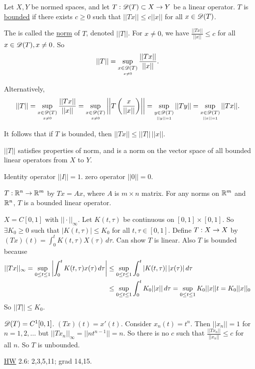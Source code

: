 \documentclass[]{article}
\begin{document}
\newpage

\begin{definition}
	Let $X,Y$ be normed spaces, and let $T:\mathscr{D}(T)\subset X\rightarrow Y$ be a linear operator.
	$T$ is \ul{bounded} if there exists $c\geq0$ such that $||Tx|| \leq c||x||$ for all $x\in\mathscr{D}(T)$.
\end{definition}
\begin{definition}
The  is called the \ul{norm} of $T$, denoted $||T||$.
For $x\neq0$, we have $\frac{||Tx||}{||x||}\leq c$ for all $x\in\mathscr{D}(T),x\neq0$.
So $$||T|| = \sup_{\underset{x\neq0}{x\in\mathscr{D}(T)}}\frac{||Tx||}{||x||}.$$
\end{definition}
Alternatively, $$ ||T|| = \sup_{\underset{x\neq0}{x\in\mathscr{D}(T)}}\frac{||Tx||}{||x||} = \sup_{\underset{x\neq0}{x\in\mathscr{D}(T)}} \left|\left|T\left(\frac x{||x||}\right)\right|\right| = \sup_{\underset{||y||=1}{y\in\mathscr{D}(T)}}||Ty|| = \sup_{\underset{||x||=1}{x\in\mathscr{D}(T)}}||Tx||.$$
\begin{note}
	It follows that if $T$ is bounded, then $||Tx|| \leq ||T||\,||x||$.
\end{note}
\begin{note}
	$||T||$ satisfies properties of  norm, and is a norm on the vector space of all bounded linear operators from $X$ to $Y$.
\end{note}
\begin{example}
	Identity operator $||I|| = 1$. zero operator $||0||=0$.
\end{example}
\begin{example}
	$T:\mathbb{R}^n\rightarrow\mathbb{R}^m$ by $Tx=Ax$, where $A$ is $m\times n$ matrix.
	For any norms on $\mathbb{R}^m$ and $\mathbb{R}^n$, $T$ is a bounded linear operator.
\end{example}
\begin{example}
	$X = C[0,1]$ with $||\cdot||_\infty$.
	Let $K(t,\tau)$ be continuous on $[0,1]\times[0,1]$. So $\exists K_0\geq 0$ such that $|K(t,\tau)|\leq K_0$ for all $t,\tau\in[0,1]$.
	Define $T:X\rightarrow X$ by $(Tx)(t) = \int_0^t K(t,\tau)X(\tau)\,d\tau$.
	Can show $T$ is linear. Also $T$ is bounded because 
	\begin{align*}
		|| Tx||_\infty = \sup_{0\leq t\leq1}\left|\int_0^t K(t,\tau)x(\tau)\,d\tau\right|
		&\leq \sup_{0\leq t\leq 1}\int_0^t |K(t,\tau)|\,|x(\tau)|\,d\tau \\
		&\leq \sup_{0\leq t\leq 1}\int_0^t K_0||x||\,d\tau
					   = \sup_{0\leq t\leq 1}K_0||x||t
					   = K_0||x||_0
	\end{align*}
	So $||T||\leq K_0$.
\end{example}
\begin{example}
	[$X = C{[}0,1{]}$ with $||\cdot||_\infty$]
	$\mathscr{D}(T) = C^1[0,1]$.
	$(Tx)(t) = x'(t)$.
	Consider $x_n(t) = t^n$.
	Then $||x_n||=1$ for $n=1,2,\dots$
	but $||Tx_n||_\infty = ||nt^{n-1}||=n$.
	So there is  no $c$ such that $\frac{||Tx_n||}{||x_n||}\leq c$ for all $n$.
	So $T$ is unbounded.
\end{example}
\ul{HW} 2.6: 2,3,5,11; grad 14,15.
\end{document}
